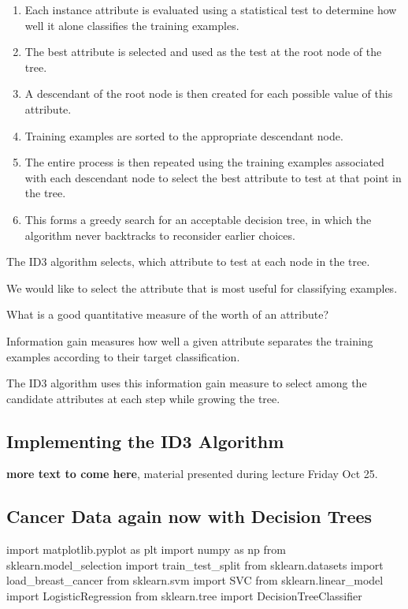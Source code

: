 \documentclass[%
oneside,                 %
final,                   %
10pt]{article}
\begin{document}
\begin{enumerate}
\item Each instance attribute is evaluated using a statistical test to determine how well it alone classifies the training examples.

\item The best attribute is selected and used as the test at the root node of the tree.

\item A descendant of the root node is then created for each possible value of this attribute.

\item Training examples are sorted to the appropriate descendant node.

\item The entire process is then repeated using the training examples associated with each descendant node to select the best attribute to test at that point in the tree.

\item This forms a greedy search for an acceptable decision tree, in which the algorithm never backtracks to reconsider earlier choices. 
\end{enumerate}

\noindent
The ID3 algorithm selects, which attribute to test at each node in the
tree.

We would like to select the attribute that is most useful for classifying
examples.

What is a good quantitative measure of the worth of an attribute?

Information gain measures how well a given attribute separates the
training examples according to their target classification.

The ID3 algorithm uses this information gain measure to select among the candidate
attributes at each step while growing the tree.

\subsection{Implementing the ID3 Algorithm}

\textbf{more text to come here}, material presented during lecture Friday Oct 25.

\subsection{Cancer Data again now with Decision Trees}
\bpycod
import matplotlib.pyplot as plt
import numpy as np
from sklearn.model_selection import  train_test_split 
from sklearn.datasets import load_breast_cancer
from sklearn.svm import SVC
from sklearn.linear_model import LogisticRegression
from sklearn.tree import DecisionTreeClassifier
\end{document}
